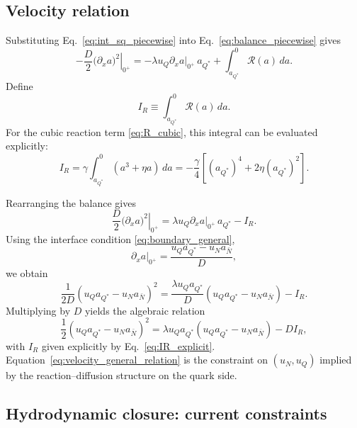 \documentclass[11pt]{article}
\begin{document}
\subsection{Velocity relation}

Substituting Eq.~\eqref{eq:int_sq_piecewise} into Eq.~\eqref{eq:balance_piecewise} gives
\begin{equation}
-\frac{D}{2}\left.\bigl(\partial_x a\bigr)^2\right|_{0^+}
=
- \lambda u_Q \left.\partial_x a\right|_{0^+}\, a_{Q^*}
+
\int_{a_{Q^*}}^{0}\mathcal R(a)\,da.
\end{equation}
Define
\begin{equation}
I_R \equiv \int_{a_{Q^*}}^{0}\mathcal R(a)\,da.
\end{equation}
For the cubic reaction term \eqref{eq:R_cubic}, this integral can be evaluated explicitly:
\begin{equation}
I_R
=
\gamma\int_{a_{Q^*}}^{0}\left(a^3+\eta a\right)\,da
=
-\frac{\gamma}{4}\left[(a_{Q^*})^4+2\eta (a_{Q^*})^2\right].
\label{eq:IR_explicit}
\end{equation}

Rearranging the balance gives
\begin{equation}
\frac{D}{2}\left.\bigl(\partial_x a\bigr)^2\right|_{0^+}
=
\lambda u_Q \left.\partial_x a\right|_{0^+}\, a_{Q^*}
-
I_R.
\label{eq:pre_velocity}
\end{equation}
Using the interface condition \eqref{eq:boundary_general},
\begin{equation}
\left.\partial_x a\right|_{0^+}
=
\frac{u_Q a_{Q^*} - u_N a_{\bar N}}{D},
\end{equation}
we obtain
\begin{equation}
\frac{1}{2D}\left(u_Q a_{Q^*} - u_N a_{\bar N}\right)^2
=
\frac{\lambda u_Q a_{Q^*}}{D}\left(u_Q a_{Q^*} - u_N a_{\bar N}\right)
-
I_R.
\end{equation}
Multiplying by $D$ yields the algebraic relation
\begin{equation}
\frac12\left(u_Q a_{Q^*} - u_N a_{\bar N}\right)^2
=
\lambda u_Q a_{Q^*}\left(u_Q a_{Q^*} - u_N a_{\bar N}\right)
-
D I_R,
\label{eq:velocity_general_relation}
\end{equation}
with $I_R$ given explicitly by Eq.~\eqref{eq:IR_explicit}.
Equation~\eqref{eq:velocity_general_relation} is the constraint on $(u_N,u_Q)$
implied by the reaction--diffusion structure on the quark side.

\subsection{Hydrodynamic closure: current constraints}
\end{document}

